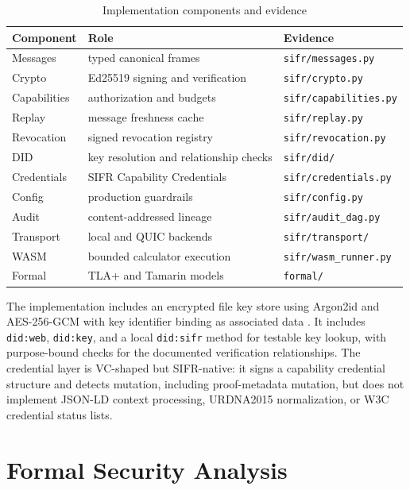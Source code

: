 \documentclass[runningheads]{llncs}
\begin{document}
\begin{table}
\caption{Implementation components and evidence}
\label{tab:impl}
\centering
\begin{tabular}{lll}
\toprule
Component & Role & Evidence \\
\midrule
Messages & typed canonical frames & \texttt{sifr/messages.py} \\
Crypto & Ed25519 signing and verification & \texttt{sifr/crypto.py} \\
Capabilities & authorization and budgets & \texttt{sifr/capabilities.py} \\
Replay & message freshness cache & \texttt{sifr/replay.py} \\
Revocation & signed revocation registry & \texttt{sifr/revocation.py} \\
DID & key resolution and relationship checks & \texttt{sifr/did/} \\
Credentials & SIFR Capability Credentials & \texttt{sifr/credentials.py} \\
Config & production guardrails & \texttt{sifr/config.py} \\
Audit & content-addressed lineage & \texttt{sifr/audit\_dag.py} \\
Transport & local and QUIC backends & \texttt{sifr/transport/} \\
WASM & bounded calculator execution & \texttt{sifr/wasm\_runner.py} \\
Formal & TLA+ and Tamarin models & \texttt{formal/} \\
\bottomrule
\end{tabular}
\end{table}

The implementation includes an encrypted file key store using Argon2id and AES-256-GCM with key identifier binding as associated data \cite{biryukov2016argon2}. It includes \texttt{did:web}, \texttt{did:key}, and a local \texttt{did:sifr} method for testable key lookup, with purpose-bound checks for the documented verification relationships. The credential layer is VC-shaped but SIFR-native: it signs a capability credential structure and detects mutation, including proof-metadata mutation, but does not implement JSON-LD context processing, URDNA2015 normalization, or W3C credential status lists.

\section{Formal Security Analysis}
\end{document}
